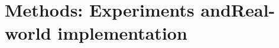 \documentclass[nomenclature, english, bibtex]{kththesis}
\newcommand*{\generalExpl}[1]{\todo[inline]{#1}}
\newcommand*{\sweExpl}[1]{\todo[inline, backgroundcolor=kth-lightblue40]{#1}}  %
\begin{document}
\chapter[Methods: Experiments and Real-world implementation]{Methods: Experiments and\linebreak[4]  Real-world implementation}
\label{ch:methods}

\end{document}
